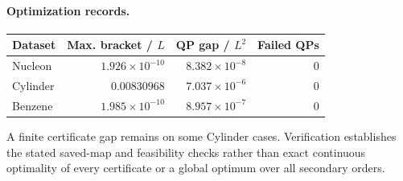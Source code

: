 \paragraph{Optimization records.}
\begin{center}\small
\begin{tabular}{lrrr}\toprule
Dataset & Max. bracket / $L$ & QP gap / $L^2$ & Failed QPs\\\midrule
Nucleon & $1.926\times10^{-10}$ & $8.382\times10^{-8}$ & 0\\
Cylinder & $0.00830968$ & $7.037\times10^{-6}$ & 0\\
Benzene & $1.985\times10^{-10}$ & $8.957\times10^{-7}$ & 0\\
\bottomrule\end{tabular}\end{center}
A finite certificate gap remains on some Cylinder cases. Verification establishes the stated saved-map and feasibility checks rather than exact continuous optimality of every certificate or a global optimum over all secondary orders.
